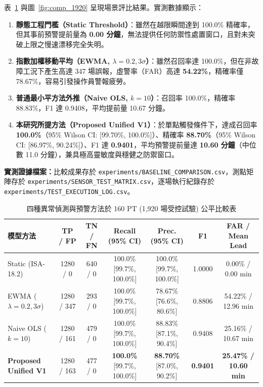 \documentclass[fontset=none, a4paper, 12pt]{ctexart}
\begin{document}
\begin{doublespace}
表~\ref{tab:baseline_comp_v2} 與圖~\ref{fig:comp_1920} 呈現場景評比結果。實測數據顯示：
\begin{enumerate}
    \item \textbf{靜態工程門檻（Static Threshold）}：雖然在越限瞬間達到 100.0\% 精確率，但其事前預警提前量為 \textbf{0.00 分鐘}，無法提供任何防禦性處置窗口，且對未突破上限之慢速漂移完全失明。
    \item \textbf{指數加權移動平均（EWMA, $\lambda=0.2, 3\sigma$）}：雖然召回率達 100.0\%，但在非故障工況下產生高達 347 場誤報，虛警率（FAR）高達 \textbf{54.22\%}，精確率僅 78.67\%，容易引發操作員警報疲勞。
    \item \textbf{普通最小平方法外推（Naive OLS, $k=10$）}：召回率 100.0\%，精確率 88.83\%，F1 達 0.9408，平均提前量 10.67 分鐘。
    \item \textbf{本研究所提方法（Proposed Unified V1）}：於單點觸發條件下，達成召回率 \textbf{100.0\%}（95\% Wilson CI: [99.70\%, 100.0\%]）、精確率 \textbf{88.70\%}（95\% Wilson CI: [86.97\%, 90.24\%]）、F1 達 \textbf{0.9401}，平均預警提前量達 \textbf{10.60 分鐘}（中位數 11.0 分鐘），兼具極高靈敏度與穩健之防禦窗口。
\end{enumerate}
{\raggedright\noindent\textbf{實測證據檔案：}比較成果存於 \texttt{experiments/BASELINE\_COMPARISON.csv}，測點矩陣存於 \texttt{experiments/SENSOR\_TEST\_MATRIX.csv}，逐場執行紀錄存於 \texttt{experiments/TEST\_EXECUTION\_LOG.csv}。\par}

\begin{table}[H]
\centering
\caption{四種異常偵測與預警方法於 160 PT (1,920 場受控試驗) 公平比較表}
\label{tab:baseline_comp_v2}
\scriptsize
\renewcommand{\arraystretch}{1.2}
\setlength{\tabcolsep}{2pt}
\begin{tabular*}{\textwidth}{@{\extracolsep{\fill}}lcccccc}
\toprule
\textbf{模型方法} & \textbf{TP / FP} & \textbf{TN / FN} & \textbf{Recall (95\% CI)} & \textbf{Prec. (95\% CI)} & \textbf{F1} & \textbf{FAR / Mean Lead} \\
\midrule
Static (ISA-18.2) & 1280 / 0   & 640 / 0 & 100.0\% [99.7\%, 100.0\%] & 100.0\% [99.7\%, 100.0\%] & 1.0000 & 0.00\% / 0.00 min \\
EWMA ($\lambda=0.2, 3\sigma$) & 1280 / 347 & 293 / 0 & 100.0\% [99.7\%, 100.0\%] & 78.67\% [76.6\%, 80.6\%] & 0.8806 & 54.22\% / 12.96 min \\
Naive OLS ($k=10$) & 1280 / 161 & 479 / 0 & 100.0\% [99.7\%, 100.0\%] & 88.83\% [87.1\%, 90.4\%] & 0.9408 & 25.16\% / 10.67 min \\
\textbf{Proposed Unified V1} & 1280 / 163 & 477 / 0 & \textbf{100.0\%} [99.7\%, 100.0\%] & \textbf{88.70\%} [87.0\%, 90.2\%] & \textbf{0.9401} & \textbf{25.47\% / 10.60 min} \\
\bottomrule
\end{tabular*}
\end{table}


\end{doublespace}
\end{document}
